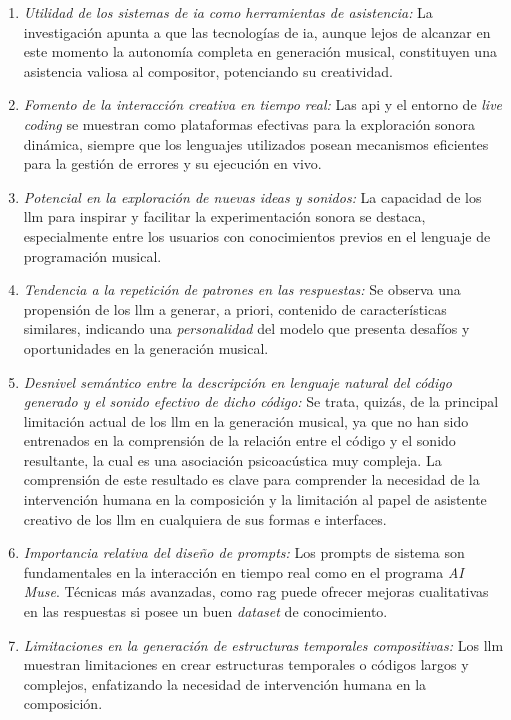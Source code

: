 \begin{enumerate}
    \item \textit{Utilidad de los sistemas de \gls{ia} como herramientas de asistencia:} La investigación apunta a que las tecnologías de \gls{ia}, aunque lejos de alcanzar en este momento la autonomía completa en generación musical, constituyen una asistencia valiosa al compositor, potenciando su creatividad.
    \item \textit{Fomento de la interacción creativa en tiempo real:} Las \gls{api} y el entorno de \emph{live coding} se muestran como plataformas efectivas para la exploración sonora dinámica, siempre que los lenguajes utilizados posean mecanismos eficientes para la gestión de errores y su ejecución en vivo.
    \item \textit{Potencial en la exploración de nuevas ideas y sonidos:} La capacidad de los \gls{llm} para inspirar y facilitar la experimentación sonora se destaca, especialmente entre los usuarios con conocimientos previos en el lenguaje de programación musical.
    \item \textit{Tendencia a la repetición de patrones en las respuestas:} Se observa una propensión de los \gls{llm} a generar, a priori, contenido de características similares, indicando una \emph{personalidad} del modelo que presenta desafíos y oportunidades en la generación musical.
    \item \textit{Desnivel semántico entre la descripción en lenguaje natural del código generado y el sonido efectivo de dicho código:} Se trata, quizás, de la principal limitación actual de los \gls{llm} en la generación musical, ya que no han sido entrenados en la comprensión de la relación entre el código y el sonido resultante, la cual es una asociación psicoacústica muy compleja. La comprensión de este resultado es clave para comprender la necesidad de la intervención humana en la composición y la limitación al papel de asistente creativo de los \gls{llm} en cualquiera de sus formas e interfaces.
    \item \textit{Importancia relativa del diseño de prompts:} Los prompts de sistema son fundamentales en la interacción en tiempo real como en el programa \emph{AI Muse}. Técnicas más avanzadas, como \gls{rag} puede ofrecer mejoras cualitativas en las respuestas si posee un buen \emph{dataset} de conocimiento. 
    \item \textit{Limitaciones en la generación de estructuras temporales compositivas:} Los \gls{llm} muestran limitaciones en crear estructuras temporales o códigos largos y complejos, enfatizando la necesidad de intervención humana en la composición.

\end{enumerate}
